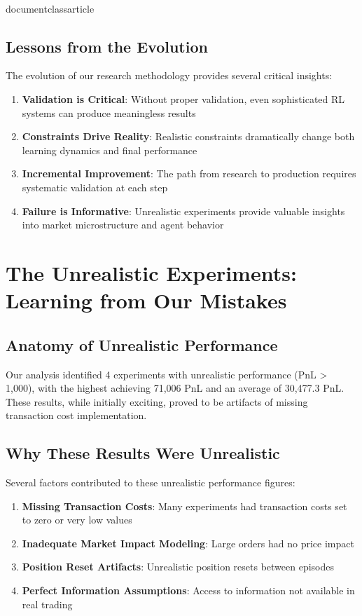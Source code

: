 \\documentclass{article}
\begin{document}
\subsection{Lessons from the Evolution}

The evolution of our research methodology provides several critical insights:

\begin{enumerate}
\item \textbf{Validation is Critical}: Without proper validation, even sophisticated RL systems can produce meaningless results
\item \textbf{Constraints Drive Reality}: Realistic constraints dramatically change both learning dynamics and final performance
\item \textbf{Incremental Improvement}: The path from research to production requires systematic validation at each step
\item \textbf{Failure is Informative}: Unrealistic experiments provide valuable insights into market microstructure and agent behavior
\end{enumerate}
\n\n
\section{The Unrealistic Experiments: Learning from Our Mistakes}

\subsection{Anatomy of Unrealistic Performance}


Our analysis identified 4 experiments with unrealistic performance (PnL > 1,000), with the highest achieving 71,006 PnL and an average of 30,477.3 PnL. These results, while initially exciting, proved to be artifacts of missing transaction cost implementation.


\subsection{Why These Results Were Unrealistic}

Several factors contributed to these unrealistic performance figures:

\begin{enumerate}
\item \textbf{Missing Transaction Costs}: Many experiments had transaction costs set to zero or very low values
\item \textbf{Inadequate Market Impact Modeling}: Large orders had no price impact
\item \textbf{Position Reset Artifacts}: Unrealistic position resets between episodes
\item \textbf{Perfect Information Assumptions}: Access to information not available in real trading
\end{enumerate}
\end{document}
